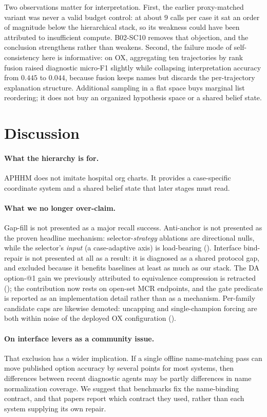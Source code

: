 Two observations matter for interpretation.
First, the earlier proxy-matched variant was never a valid budget control: at about $9$ calls per case it sat an order of magnitude below the hierarchical stack, so its weakness could have been attributed to insufficient compute.
B02-SC10 removes that objection, and the conclusion strengthens rather than weakens.
Second, the failure mode of self-consistency here is informative: on OX, aggregating ten trajectories by rank fusion raised diagnostic micro-F1 slightly while collapsing interpretation accuracy from $0.445$ to $0.044$, because fusion keeps names but discards the per-trajectory explanation structure.
Additional sampling in a flat space buys marginal list reordering; it does not buy an organized hypothesis space or a shared belief state.

\section{Discussion}
\label{sec:discussion}

\paragraph{What the hierarchy is for.}
APHHM does not imitate hospital org charts.
It provides a case-specific coordinate system and a shared belief state that later stages must read.

\paragraph{What we no longer over-claim.}
Gap-fill is not presented as a major recall success.
Anti-anchor is not presented as the proven headline mechanism: selector-\emph{strategy} ablations are directional nulls, while the selector's \emph{input} (a case-adaptive axis) is load-bearing ().
Interface bind-repair is not presented at all as a result: it is diagnosed as a shared protocol gap, and excluded because it benefits baselines at least as much as our stack.
The DA option-@1 gain we previously attributed to equivalence compression is retracted (); the contribution now rests on open-set MCR endpoints, and the gate predicate is reported as an implementation detail rather than as a mechanism.
Per-family candidate caps are likewise demoted: uncapping and single-champion forcing are both within noise of the deployed OX configuration ().

\paragraph{On interface levers as a community issue.}
That exclusion has a wider implication.
If a single offline name-matching pass can move published option accuracy by several points for most systems, then differences between recent diagnostic agents may be partly differences in name normalization coverage.
We suggest that benchmarks fix the name-binding contract, and that papers report which contract they used, rather than each system supplying its own repair.

